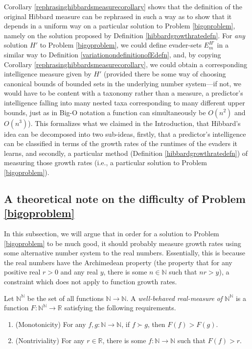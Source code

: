 \documentclass[twoside,11pt]{article}
\begin{document}
\begin{remark}
\label{epiphanyremark}
Corollary \ref{rephrasinghibbardsmeasurecorollary} shows that
the definition of the original Hibbard measure can be rephrased in such a way
as to show that it depends in a uniform way on a particular solution to
Problem \ref{bigoproblem}, namely on the solution proposed by
Definition \ref{hibbardgrowthratedefn}. For \emph{any} solution $H'$ to
Problem \ref{bigoproblem}, we could define evader-sets $E^{H'}_m$ in a similar
way to Definition \ref{variationondefinitionofEdefn}, and, by copying
Corollary \ref{rephrasinghibbardsmeasurecorollary}, we could obtain a corresponding
intelligence measure given by $H'$
(provided there be some way of choosing canonical bounds of bounded sets in the
underlying number system---if not, we would have to be content with a taxonomy
rather than a measure, a predictor's intelligence falling into many nested
taxa corresponding to many different upper bounds, just as in Big-O notation a
function can simultaneously be $O(n^2)$ and $O(n^3)$).
This formalizes what we claimed in the Introduction,
that Hibbard's idea can be decomposed into two sub-ideas, firstly, that a predictor's
intelligence can be classified in terms of the growth rates of the runtimes of the
evaders it learns, and secondly, a particular method
(Definition \ref{hibbardgrowthratedefn})
of measuring those growth rates (i.e., a particular solution to
Problem \ref{bigoproblem}).
\end{remark}

\subsection{A theoretical note on the difficulty of Problem \ref{bigoproblem}}

In this subsection, we will argue that in order for a solution to Problem \ref{bigoproblem}
to be much good, it should probably measure growth rates using some alternative
number system to the real numbers. Essentially,
this is because the real numbers have the Archimedean property
(the property that for any positive real $r>0$ and any real $y$, there is
some $n\in\mathbb N$ such that $nr>y$), a constraint which does
not apply to function growth rates.

\begin{definition}
    Let $\mathbb N^\mathbb N$ be the set of all functions $\mathbb N\to\mathbb N$.
    A \emph{well-behaved real-measure of $\mathbb N^\mathbb N$} is a function
    $F:\mathbb N^\mathbb N\to\mathbb R$ satisfying the following requirements.
    \begin{enumerate}
        \item (Monotonicity)
        For any $f,g:\mathbb N\to\mathbb N$, if $f\succ g$, then $F(f)>F(g)$.
        \item (Nontriviality)
        For any $r\in\mathbb R$, there is some $f:\mathbb N\to\mathbb N$ such that
        $F(f)>r$.
    \end{enumerate}
\end{definition}
\end{document}
